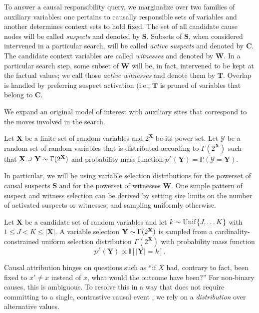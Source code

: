 \documentclass[anon,12pt]{clear2026} %
\begin{document}
To answer a causal responsibility query, we marginalize over two families of auxiliary variables: one pertains to causally responsible sets of variables and another determines context sets to hold fixed.
The set of all candidate cause nodes will be called \emph{suspects} and denoted by $\mathbf{S}$. Subsets of $\mathbf{S}$, when considered intervened in a particular search, will be called \emph{active suspects} and denoted by $\mathbf{C}$. 
The candidate context variables are called \emph{witnesses} and denoted by $\mathbf{W}$. In a particular search step, some subset of $\mathbf{W}$ will be, in fact, intervened to be kept at the factual values; we call those \emph{active witnesses} and denote them by $\mathbf{T}$. Overlap is handled by preferring suspect activation (i.e., $\mathbf{T}$ is pruned of variables that belong to $\mathbf{C}$.

We expand an original model of interest with auxiliary sites that correspond to the moves involved in the search. 

\begin{definition}
Let $\mathbf{X}$ be a finite set of random variables and $2^\mathbf{X}$ be its power set. Let $\mathcal{Y}$ be a random set of random variables that is distributed according to $\Gamma(2^\mathbf{X})$ such that $ \mathbf{X} \supseteq \mathbf{Y} \thicksim \Gamma(2^\mathbf{X})$ and probability mass function $p^\Gamma(\mathbf{Y}) = \mathbb{P}(\mathcal{Y} = \mathbf{Y})$.
\end{definition}


\noindent In particular, we will be using variable selection distributions for the powerset of causal suspects $\mathbf{S}$ and for the powerset of witnesses $\mathbf{W}$. One simple pattern of suspect and witness selection can be derived by setting size limits on the number of activated suspects or witnesses, and sampling uniformly otherwise.

\begin{example}
Let $\mathbf{X}$ be a candidate set of random variables and let $k \thicksim \mathrm{Unif}\{J, \dots K\}$ with $1 \leq J < K \leq |\mathbf{X}|$. A variable selection $\mathbf{Y} \thicksim \Gamma(2^\mathbf{X})$ is sampled from a cardinality-constrained uniform selection distribution $\Gamma(2^\mathbf{X})$ with probability mass function
\[
p^\Gamma(\mathbf{Y}) \propto \mathbb{I}[|\mathbf{Y}| = k].
\]
\end{example}


Causal attribution hinges on questions such as ``if $X$ had, contrary to fact, been fixed to $x'\ne x$ instead of $x$, what would the outcome have been?'' For non-binary causes, this is ambiguous. To resolve this in a way that does not require committing to a single, contrastive causal event \citep{kawakammi_2024_poc_for_cont_and_vec}, we rely on a \textit{distribution} over alternative values.
\end{document}
